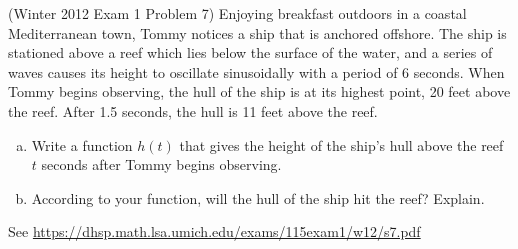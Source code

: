 \documentclass[11pt]{exam}
\begin{document}
\begin{questions}
\question (Winter 2012 Exam 1 Problem 7) Enjoying breakfast outdoors in a coastal Mediterranean town, Tommy notices a ship that is anchored offshore. The ship is stationed above a reef which lies below the surface of the water, and a series of waves causes its height to oscillate sinusoidally with a period of 6 seconds. When Tommy begins observing, the hull of the ship is at its highest point, 20 feet above the reef. After 1.5 seconds, the hull is 11 feet above the reef.
\begin{enumerate}[(a)]
	\item Write a function $h(t)$ that gives the height of the ship's hull above the reef $t$ seconds after Tommy begins observing.
	\item According to your function, will the hull of the ship hit the reef? Explain.
\end{enumerate}
\begin{solution}
  See \href{https://dhsp.math.lsa.umich.edu/exams/115exam1/w12/s7.pdf}{https://dhsp.math.lsa.umich.edu/exams/115exam1/w12/s7.pdf}
\end{solution}
\end{questions}
\end{document}
